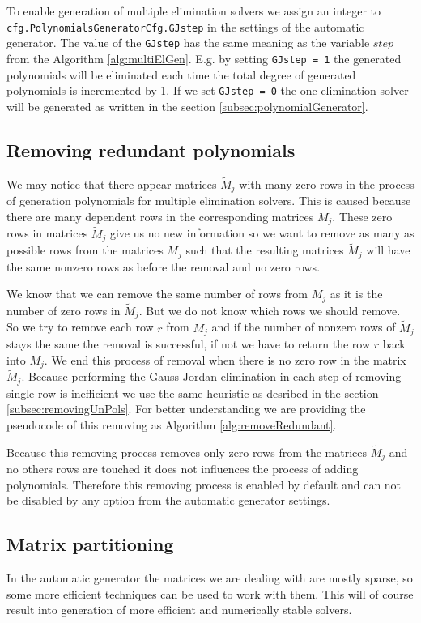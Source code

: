 To enable generation of multiple elimination solvers we assign an integer to \texttt{cfg.Poly\-nomials\-Gene\-rator\-Cfg.GJstep} in the settings of the automatic generator. The value of the \texttt{GJstep} has the same meaning as the variable $step$ from the Algorithm \ref{alg:multiElGen}. E.g. by setting \texttt{GJstep = 1} the generated polynomials will be eliminated each time the total degree of generated polynomials is incremented by 1. If we set \texttt{GJstep = 0} the one elimination solver will be generated as written in the section \ref{subsec:polynomialGenerator}.

\subsection{Removing redundant polynomials}
\label{subsec:removeRedundant}
We may notice that there appear matrices $\tilde{M}_j$ with many zero rows in the process of generation polynomials for multiple elimination solvers. This is caused because there are many dependent rows in the corresponding matrices $M_j$. These zero rows in matrices $\tilde{M}_j$ give us no new information so we want to remove as many as possible rows from the matrices $M_j$ such that the resulting matrices $\tilde{M}_j$ will have the same nonzero rows as before the removal and no zero rows.

We know that we can remove the same number of rows from $M_j$ as it is the number of zero rows in $\tilde{M}_j$. But we do not know which rows we should remove. So we try to remove each row $r$ from $M_j$ and if the number of nonzero rows of $\tilde{M}_j$ stays the same the removal is successful, if not we have to return the row $r$ back into $M_j$. We end this process of removal when there is no zero row in the matrix $\tilde{M}_j$. Because performing the Gauss-Jordan elimination in each step of removing single row is inefficient we use the same heuristic as desribed in the section \ref{subsec:removingUnPols}. For better understanding we are providing the pseudocode of this removing as Algorithm \ref{alg:removeRedundant}.



Because this removing process removes only zero rows from the matrices $\tilde{M}_j$ and no others rows are touched it does not influences the process of adding polynomials. Therefore this removing process is enabled by default and can not be disabled by any option from the automatic generator settings.

\subsection{Matrix partitioning}
\label{subsec:matrixPart}
In the automatic generator the matrices we are dealing with are mostly sparse, so some more efficient techniques can be used to work with them. This will of course result into generation of more efficient and numerically stable solvers.

